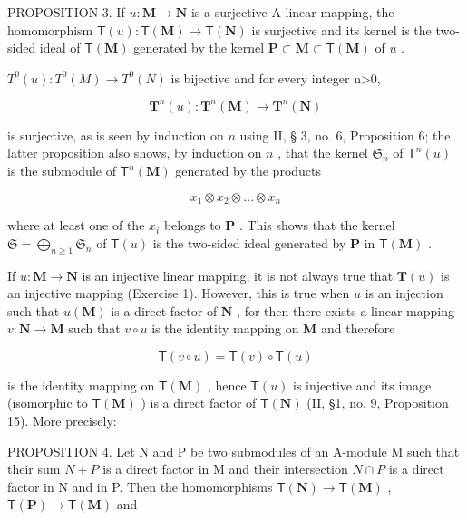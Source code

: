 PROPOSITION 3. If \(u: \mathbf{M} \to \mathbf{N}\) is a surjective A-linear mapping, the homomorphism \(\mathsf{T}(u): \mathsf{T}(\mathbf{M}) \to \mathsf{T}(\mathbf{N})\) is surjective and its kernel is the two-sided ideal of \(\mathsf{T}(\mathbf{M})\) generated by the kernel \(\mathbf{P} \subset \mathbf{M} \subset \mathsf{T}(\mathbf{M})\) of \(u\) .

\(T^{0}(u):T^{0}(M)\rightarrow T^{0}(N)\) is bijective and for every integer n\textgreater0,

\[
\mathbf {T} ^ {n} (u): \mathbf {T} ^ {n} (\mathbf {M}) \rightarrow \mathbf {T} ^ {n} (\mathbf {N})
\]

is surjective, as is seen by induction on \(n\) using II, § 3, no. 6, Proposition 6; the latter proposition also shows, by induction on \(n\) , that the kernel \(\mathfrak{S}_n\) of \(\mathsf{T}^n(u)\) is the submodule of \(\mathsf{T}^n(\mathbf{M})\) generated by the products

\[
x _ {1} \otimes x _ {2} \otimes \dots \otimes x _ {n}
\]

where at least one of the \(x_{i}\) belongs to \(\mathbf{P}\) . This shows that the kernel \(\mathfrak{S} = \bigoplus_{n\geqslant 1}\mathfrak{S}_n\) of \(\mathsf{T}(u)\) is the two-sided ideal generated by \(\mathbf{P}\) in \(\mathsf{T}(\mathbf{M})\) .

If \(u: \mathbf{M} \to \mathbf{N}\) is an injective linear mapping, it is not always true that \(\mathbf{T}(u)\) is an injective mapping (Exercise 1). However, this is true when \(u\) is an injection such that \(u(\mathbf{M})\) is a direct factor of \(\mathbf{N}\) , for then there exists a linear mapping \(v: \mathbf{N} \to \mathbf{M}\) such that \(v \circ u\) is the identity mapping on \(\mathbf{M}\) and therefore

\[
\mathsf {T} (v \circ u) = \mathsf {T} (v) \circ \mathsf {T} (u)
\]

is the identity mapping on \(\mathsf{T}(\mathbf{M})\) , hence \(\mathsf{T}(u)\) is injective and its image (isomorphic to \(\mathsf{T}(\mathbf{M})\) ) is a direct factor of \(\mathsf{T}(\mathbf{N})\) (II, §1, no. 9, Proposition 15). More precisely:

PROPOSITION 4. Let N and P be two submodules of an A-module M such that their sum \(N + P\) is a direct factor in M and their intersection \(N \cap P\) is a direct factor in N and in P. Then the homomorphisms \(\mathsf{T}(\mathbf{N}) \to \mathsf{T}(\mathbf{M})\) , \(\mathsf{T}(\mathbf{P}) \to \mathsf{T}(\mathbf{M})\) and

